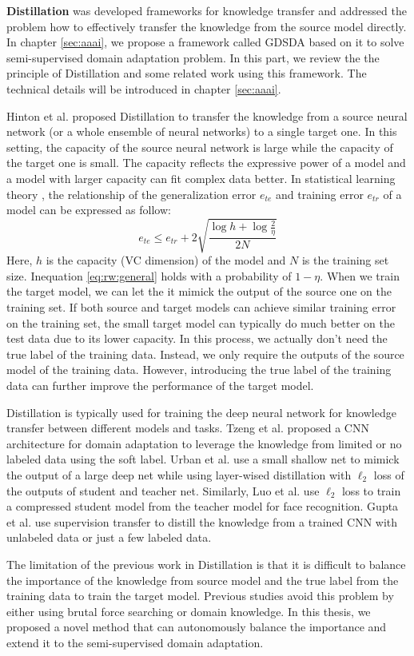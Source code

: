 \textbf{Distillation} \cite{hinton2015distilling} was developed frameworks for knowledge transfer and addressed the problem how to effectively transfer the knowledge from the source model directly. In chapter \ref{sec:aaai}, we propose a framework called GDSDA based on it to solve semi-supervised domain adaptation problem. In this part, we review the the principle of Distillation and some related work using this framework. The technical details will be introduced in chapter \ref{sec:aaai}.

Hinton et al. proposed Distillation to transfer the knowledge from a source neural network (or a whole ensemble of neural networks) to a single target one. In this setting, the capacity of the source neural network is large while the capacity of the target one is small. The capacity reflects the expressive power of a model and a model with larger capacity can fit complex data better. In statistical learning theory \cite{vapnik1999overview}, the relationship of the generalization error $e_{te}$ and training error $e_{tr}$ of a model can be expressed as follow:
\begin{equation}\label{eq:rw:general}
e_{te}\leq e_{tr}+2\sqrt{\frac{\log h +\log\frac{2}{\eta}}{2N}}
\end{equation}
Here, $h$ is the capacity (VC dimension) of the model and $N$ is the training set size. Inequation \ref{eq:rw:general} holds with a probability of $1-\eta$.
When we train the target model, we can let the it mimick the output of the source one on the training set. If both source and target models can achieve similar training error on the training set, the small target model can typically do much better on the test data due to its lower capacity. In this process, we actually don't need the true label of the training data. Instead, we only require the outputs of the source model of the training data. However, introducing the true label of the training data can further improve the performance of the target model.

Distillation is typically used for training the deep neural network for knowledge transfer between different models and tasks. Tzeng et al. \cite{Tzeng_2015_ICCV} proposed a CNN architecture for domain adaptation to leverage the knowledge from limited or no labeled data using the soft label. Urban et al. \cite{urban2016deep} use a small shallow net to mimick the output of a large deep net while using layer-wised distillation with $\ell_2$ loss of the outputs of student and teacher net. Similarly, Luo et al. \cite{luo2016face} use $\ell_2$ loss to train a compressed student model from the teacher model for face recognition. Gupta et al. \cite{Gupta_2016_CVPR} use supervision transfer to distill the knowledge from a trained CNN with unlabeled data or just a few labeled data.

The limitation of the previous work in Distillation is that it is difficult to balance the importance of the knowledge from source model and the true label from the training data to train the target model. Previous studies avoid this problem by either using brutal force searching or domain knowledge. In this thesis, we proposed a novel method that can autonomously balance the importance and extend it to the semi-supervised domain adaptation.

